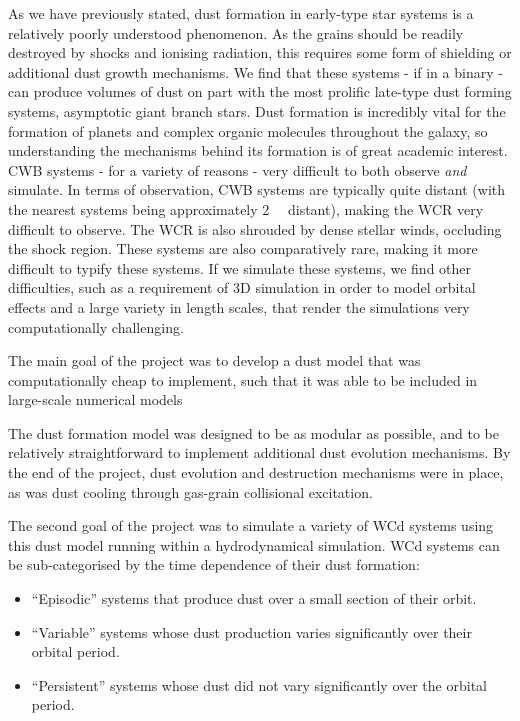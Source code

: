 As we have previously stated, dust formation in early-type star systems is a relatively poorly understood phenomenon.
As the grains should be readily destroyed by shocks and ionising radiation, this requires some form of shielding or additional dust growth mechanisms.
We find that these systems - if in a binary - can produce volumes of dust on part with the most prolific late-type dust forming systems, asymptotic giant branch stars.
Dust formation is incredibly vital for the formation of planets and complex organic molecules throughout the galaxy, so understanding the mechanisms behind its formation is of great academic interest.
CWB systems - for a variety of reasons - very difficult to both observe \emph{and} simulate.
In terms of observation, CWB systems are typically quite distant (with the nearest systems being approximately \SI{2}{\kilo\parsec} distant), making the WCR very difficult to observe.
The WCR is also shrouded by dense stellar winds, occluding the shock region.
These systems are also comparatively rare, making it more difficult to typify these systems.
If we simulate these systems, we find other difficulties, such as a requirement of 3D simulation in order to model orbital effects and a large variety in length scales, that render the simulations very computationally challenging.

The main goal of the project was to develop a dust model that was computationally cheap to implement, such that it was able to be included in large-scale numerical models 

The dust formation model was designed to be as modular as possible, and to be relatively straightforward to implement additional dust evolution mechanisms.
By the end of the project, dust evolution and destruction mechanisms were in place, as was dust cooling through gas-grain collisional excitation.

The second goal of the project was to simulate a variety of WCd systems using this dust model running within a hydrodynamical simulation.
WCd systems can be sub-categorised by the time dependence of their dust formation:

\begin{itemize}
  \item ``Episodic'' systems that produce dust over a small section of their orbit. 
  \item ``Variable'' systems whose dust production varies significantly over their orbital period.
  \item ``Persistent'' systems whose dust did not vary significantly over the orbital period.
\end{itemize}

